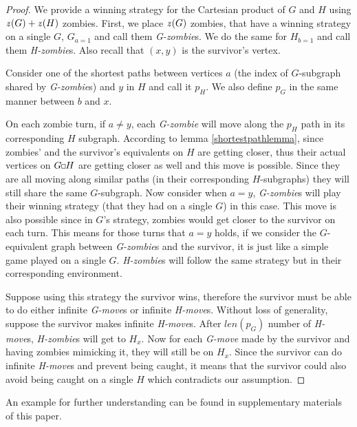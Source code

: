 \documentclass[1p]{elsarticle}
\newcommand{\zn}{\ooalign{$z$\cr\hfil\rule[.5ex]{.2em}{.08ex}\hfil\cr}}
\newcommand{\sq}[1][black]{%
\begin{tikzpicture}                                                           
  \draw[#1] (2pt,0pt) -- (6pt,0pt);   
  \draw[#1] (2pt,0pt) -- (2pt,4pt);    
  \draw[#1] (2pt,4pt) -- (6pt,4pt);   
  \draw[#1] (6pt,0pt) -- (6pt,4pt);
\end{tikzpicture}%
}
\begin{document}
\begin{proof}
	We provide a winning strategy for the Cartesian product of $G$ and $H$ using $\zn(G)+\zn(H)$ zombies. First, we place
	$\zn(G)$ zombies, that have a winning strategy on a single $G$, $G_{a = 1}$ and call them {\it G-zombie}s. We do the
	same for $H_{b = 1}$ and call them {\it H-zombie}s. Also recall that $(x,y)$ is the survivor's vertex.


	Consider one of the shortest paths between vertices $a$ (the index of $G$-subgraph shared by {\it G-zombie}s) and
	$y$ in $H$ and call it $p_H$. We also define $p_G$ in the same manner between $b$ and $x$.


	On each zombie turn, if $a \neq y$, each {\it G-zombie} will move along the $p_H$ path in its corresponding $H$
	subgraph. According to lemma \ref{shortestpathlemma}, since zombies' and the survivor's equivalents on $H$ are
	getting closer, thus their actual vertices on $G \sq H$ are getting closer as well and this move is possible. Since
	they are all moving along similar paths (in their corresponding $H$-subgraphs) they will still share the same
	$G$-subgraph. Now consider when $a = y$, {\it G-zombie}s will play their winning strategy (that they had on a single
	$G$) in this case. This move is also possible since in $G$'s strategy, zombies would get closer to the survivor on
	each turn. This means for those turns that $a=y$ holds, if we consider the $G$-equivalent graph between {\it
	G-zombie}s and the survivor, it is just like a simple game played on a single $G$. {\it H-zombie}s will follow the
	same strategy but in their corresponding environment.
	
	
	Suppose using this strategy the survivor wins, therefore the survivor must be able to do either infinite {\it
	G-move}s or infinite {\it H-move}s. Without loss of generality, suppose the survivor makes infinite {\it H-move}s.
	After $len(p_G)$ number of {\it H-move}s, {\it H-zombie}s will get to $H_x$. Now for each {\it G-move} made by the
	survivor and having zombies mimicking it, they will still be on $H_x$. Since the survivor can do infinite {\it
	H-move}s and prevent being caught, it means that the survivor could also avoid being caught on a single $H$ which
	contradicts our assumption.
	
\end{proof}
An example for further understanding can be found in supplementary materials of this paper.
\end{document}
